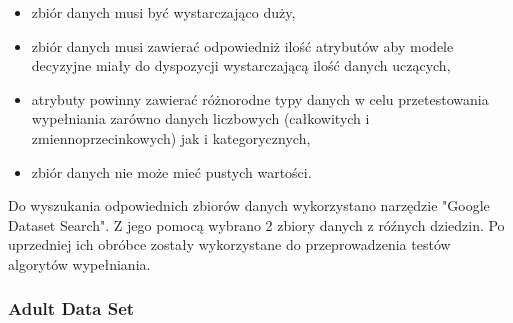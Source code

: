 \documentclass[12pt,twoside]{article}
\begin{document}
\begin{itemize}[label=-,labelsep=0.4cm, leftmargin=1.25cm]
    \item zbiór danych musi być wystarczająco duży,
    \item zbiór danych musi zawierać odpowiedniż ilość atrybutów aby modele decyzyjne miały
    do dyspozycji wystarczającą ilość danych uczących,
    \item atrybuty powinny zawierać różnorodne typy danych w celu przetestowania wypełniania zarówno danych
    liczbowych (całkowitych i zmiennoprzecinkowych) jak i kategorycznych,
    \item zbiór danych nie może mieć pustych wartości.
\end{itemize}

Do wyszukania odpowiednich zbiorów danych wykorzystano narzędzie "Google Dataset Search".
Z jego pomocą wybrano 2 zbiory danych z róźnych dziedzin.
Po uprzedniej ich obróbce zostały wykorzystane do przeprowadzenia testów algorytów wypełniania.
\subsubsection{Adult Data Set}
\end{document}

